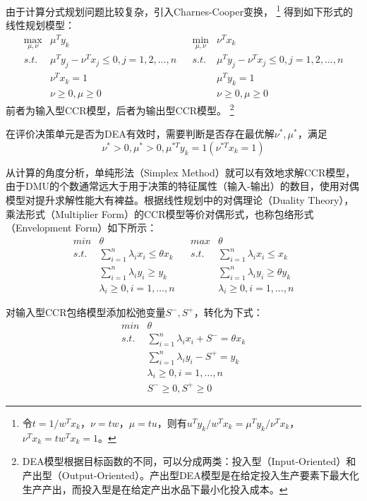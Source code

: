 由于计算分式规划问题比较复杂，引入Charnes-Cooper变换，
\footnote{令$t=1/w^Tx_k$，$\nu=tw$，$\mu=tu$，则有$u^Ty_k/w^Tx_k=\mu^Ty_k/\nu^Tx_k$，$\nu^Tx_k=tw^Tx_k=1$。}
得到如下形式的线性规划模型：
\begin{equation}\label{eq:ccr}
\begin{array}{lllll}
  \max\limits_{\mu,\nu} & \mu^Ty_k & & \min\limits_{\mu,\nu} & \nu^T x_k\\
  \textit{s.t.} & \mu^Ty_j -\nu^Tx_j \le 0, j=1,2,\dots,n & & \textit{s.t.} & \mu^Ty_j -\nu^Tx_j \le 0, j=1,2,\dots,n \\
   & \nu^Tx_k = 1 & & & \mu^T y_k = 1\\
   & \nu\geq 0, \mu\geq 0 & & & \nu\geq 0, \mu\geq 0
\end{array}
\end{equation}
前者为输入型CCR模型，后者为输出型CCR模型。
\footnote{DEA模型根据目标函数的不同，可以分成两类：投入型（Input-Oriented）和产出型（Output-Oriented）。产出型DEA模型是在给定投入生产要素下最大化生产产出，而投入型是在给定产出水品下最小化投入成本。}

在评价决策单元是否为DEA有效时，需要判断是否存在最优解$\nu^{*},\mu^{*}$，满足
\begin{equation}
  \nu^{*} >0, \mu^{*} >0, \mu^{*T}y_k = 1(\nu^{*T}x_k = 1)
\end{equation}

从计算的角度分析，单纯形法（Simplex Method）就可以有效地求解CCR模型\cite{cooper2011data}，由于DMU的个数通常远大于用于决策的特征属性（输入-输出）的数目，使用对偶模型对提升求解性能大有裨益。根据线性规划中的对偶理论（Duality Theory），乘法形式（Multiplier Form）的CCR模型等价对偶形式，也称包络形式（Envelopment Form）如下所示：
\begin{equation}\label{eq:dualccr}
\begin{array}{lllll}
  \textit{min} & \theta & & \textit{max} & \theta\\
  \textit{s.t.} &  \sum\limits_{i = 1}^n \lambda_i x_i \le \theta x_k & & \textit{s.t.} & \sum\limits_{i = 1}^n \lambda_i x_i \le x_k\\
   & \sum\limits_{i = 1}^n \lambda_i y_i \ge y_k & & & \sum\limits_{i = 1}^n \lambda_i y_i \ge \theta y_k\\
   & \lambda_i \ge 0, i = 1, \ldots, n & & & \lambda_i \ge 0, i = 1, \ldots, n
\end{array}
\end{equation}

对输入型CCR包络模型添加松弛变量$S^{-},S^{+}$，转化为下式：
\begin{equation}\label{eq:inputdualccr}
\begin{array}{ll}
  \textit{min} & \theta\\
  \textit{s.t.} & \sum\limits_{i = 1}^n \lambda_i x_i + S^{-} = \theta x_k \\
   & \sum\limits_{i = 1}^n \lambda_i y_i - S^{+} = y_k\\
   & \lambda_i \ge 0, i = 1, \ldots, n\\
   & S^{-} \ge 0, S^{+}\ge 0
\end{array}
\end{equation}

